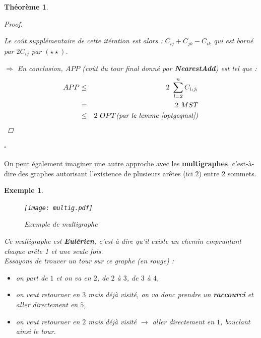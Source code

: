 \documentclass[12pt]{article}
\newcommand{\cqfd}{\begin{flushright}$\square$\end{flushright}}
\newtheorem{exemple}{Exemple}[section]
\newtheorem{thm}{Th\'eor\`eme}[section]
\newtheorem{proof}{Preuve}[section]
\begin{document}
\begin{thm}
\begin{proof}
\begin{itemize}
Le coût supplémentaire de cette itération est alors : $C_{ij}+C_{jk}-C_{ik}$ qui est borné par $2C_{ij}$ par $(\star\star )$. \\
\end{itemize}

\noindent $\Rightarrow$ En conclusion, $APP$ (coût du tour final donné par \textbf{NearestAdd}) est tel que :
\begin{eqnarray}
\nonumber APP &\leq& 2\ \sum_{l=2}^n C_{i_lj_l} \\
\nonumber     & =  & 2\ MST \\
\nonumber     & \leq & 2\ OPT \text{\textit{(par le lemme \ref{optgeqmst})}}
\end{eqnarray}
\end{proof}
\cqfd
\end{thm}

On peut également imaginer une autre approche avec les \textbf{multigraphes}, c'est-à-dire des graphes autorisant l'existence de plusieurs
arêtes (ici $2$) entre $2$ sommets.

\begin{exemple}$ $\\
\begin{figure}[H]
    \begin{center}
    \texttt{[image: multig.pdf]}
    \caption{Exemple de multigraphe}
    \end{center}
\end{figure}

\noindent Ce multigraphe est \textbf{Eulérien}, c'est-à-dire qu'il existe un chemin empruntant chaque arête 1 et une seule fois.\\
Essayons de trouver un tour sur ce graphe (en rouge) :
\begin{itemize}
\item on part de $1$ et on va en $2$, de $2$ à $3$, de $3$ à $4$,
\item on veut retourner en $3$ mais déjà visité, on va donc prendre un \textbf{raccourci} et aller directement en $5$,
\item on veut retourner en $2$ mais déjà visité $\rightarrow$ aller directement en $1$, bouclant ainsi le tour.
\end{itemize}
\end{exemple}
\end{document}
